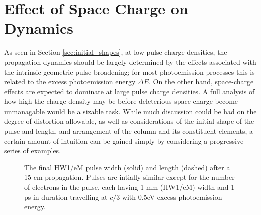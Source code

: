 
\section{Effect of Space Charge on Dynamics} \label{sec:free_spacecharge}

As seen in Section \ref{sec:initial_shapes}, at low pulse charge densities, the propagation dynamics should be largely determined by the effects associated with the intrinsic geometric pulse broadening; for most photoemission processes this is related to the excess photoemission energy $\Delta E$.
On the other hand, space-charge effects are expected to dominate at large pulse charge densities.
A full analysis of how high the charge density may be before deleterious space-charge become unmanagable would be a sizable task.
While much discussion could be had on the degree of distortion allowable, as well as considerations of the initial shape of the pulse and length, and arrangement of the column and its constituent elements, a certain amount of intuition can be gained simply by considering a progressive series of examples.

\begin{figure}
  \centering
  \begin{tikzpicture}
    
  \end{tikzpicture}
  \caption[Idealistic free-space pulse evolution vs charge density]{
    The final HW1/eM pulse width (solid) and length (dashed) after a 15 cm propagation. 
    Pulses are intially similar except for the number of electrons in the pulse, each having 1 mm (HW1/eM) width and 1 ps in duration travelling at $c/3$ with 0.5eV excess photoemission energy.
  }
  \label{fig:spacecharge_noacc}
\end{figure}

